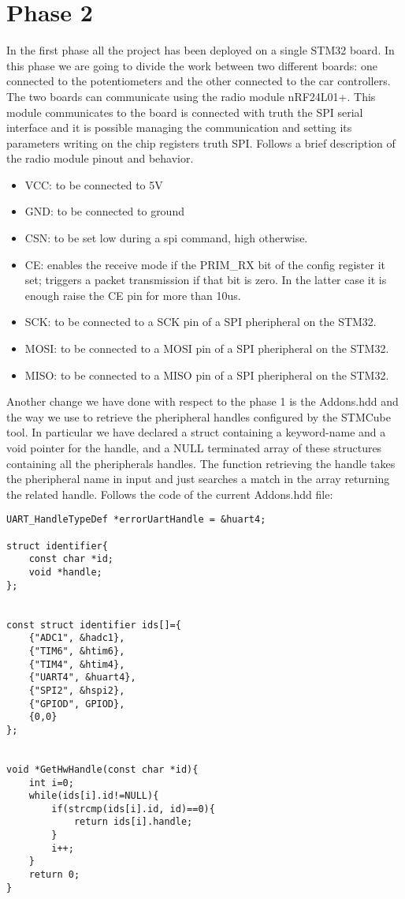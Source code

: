 \section{Phase 2}
In the first phase all the project has been deployed on a single STM32 board. In this phase we are going to divide the work between two different boards: one connected to the potentiometers and the other connected to the car controllers. The two boards can communicate using the radio module nRF24L01+. This module communicates to the board is connected with truth the SPI serial interface and it is possible managing the communication and setting its parameters writing on the chip registers truth SPI. Follows a brief description of the radio module pinout and behavior.
\begin{itemize}
\item VCC: to be connected to 5V
\item GND: to be connected to ground
\item CSN: to be set low during a spi command, high otherwise.
\item CE: enables the receive mode if the PRIM\_RX bit of the config register it set; triggers a packet transmission if that bit is zero. In the latter case it is enough raise the CE pin for more than 10us.
\item SCK: to be connected to a SCK pin of a SPI pheripheral on the STM32. 
\item MOSI: to be connected to a MOSI pin of a SPI pheripheral on the STM32.
\item MISO: to be connected to a MISO pin of a SPI pheripheral on the STM32.
\end{itemize}
Another change we have done with respect to the phase 1 is the Addons.hdd and the way we use to retrieve the pheripheral handles configured by the STMCube tool. In particular we have declared a struct containing a keyword-name and a void pointer for the handle, and a NULL terminated array of these structures containing all the pheripherals handles. The function retrieving the handle takes the pheripheral name in input and just searches a match in the array returning the related handle. Follows the code of the current Addons.hdd file:
\begin{lstlisting}
UART_HandleTypeDef *errorUartHandle = &huart4;

struct identifier{
	const char *id;
	void *handle;
};


const struct identifier ids[]={
	{"ADC1", &hadc1},
	{"TIM6", &htim6},
	{"TIM4", &htim4},
	{"UART4", &huart4},
	{"SPI2", &hspi2},
	{"GPIOD", GPIOD},
	{0,0}
}; 


void *GetHwHandle(const char *id){
	int i=0;
	while(ids[i].id!=NULL){
		if(strcmp(ids[i].id, id)==0){
			return ids[i].handle;
		}
		i++;
	}
	return 0;
}
\end{lstlisting}
